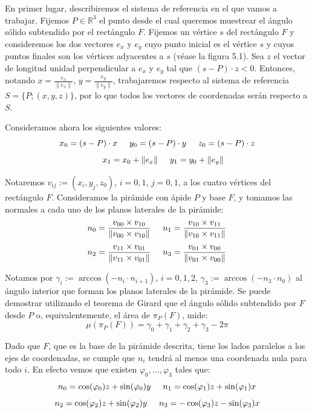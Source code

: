 En primer lugar, describiremos el sistema de referencia en el que vamos a trabajar. Fijemos $P\in\mathds{R}^3$ el punto desde el cual queremos muestrear el ángulo sólido subtendido por el rectángulo $F$. Fijemos un vértice $s$ del rectángulo $F$ y consideremos los dos vectores $e_x$ y $e_y$ cuyo punto inicial es el vértice $s$ y cuyos puntos finales son los vértices adyacentes a $s$ (véase la figura 5.1). Sea $z$ el vector de longitud unidad perpendicular a $e_x$ y $e_y$ tal que $(s-P)\cdot z < 0$. Entonces, notando $x=\frac{e_x}{\|e_x\|}$, $y=\frac{e_y}{\|e_y\|}$, trabajaremos respecto al sistema de referencia $S=\{P; (x, y, z)\}$, por lo que todos los vectores de coordenadas serán respecto a $S$.

Consideramos ahora los siguientes valores:
$$ x_0 = (s-P)\cdot x\hspace{0.5cm}y_0 = (s-P)\cdot y\hspace{0.5cm}z_0 = (s-P)\cdot z$$
$$\hspace{0.5cm}x_1 = x_0+\|e_x\|\hspace{0.5cm}y_1 = y_0+\|e_y\|$$

Notaremos $v_{ij} := (x_i,y_j,z_0)$, $i=0,1$, $j=0,1$, a los cuatro vértices del rectángulo $F$. Consideramos la pirámide con ápide $P$ y base $F$, y tomamos las normales a cada uno de los planos laterales de la pirámide:
$$ n_0 = \frac{v_{00}\times v_{10}}{\|v_{00}\times v_{10}\|}\hspace{0.5cm}n_1 = \frac{v_{10}\times v_{11}}{\|v_{10}\times v_{11}\|}$$
$$ n_2 = \frac{v_{11}\times v_{01}}{\|v_{11}\times v_{01}\|}\hspace{0.5cm}n_3 = \frac{v_{01}\times v_{00}}{\|v_{01}\times v_{00}\|}$$

Notamos por $\gamma_i := \arccos(-n_i\cdot n_{i+1})$, $i=0,1,2$, $\gamma_3 := \arccos(-n_3\cdot n_0)$ al ángulo interior que forman los planos laterales de la pirámide. Se puede demostrar utilizando el teorema de Girard que el ángulo sólido subtendido por $F$ desde $P$ o, equivalentemente, el área de $\pi_P(F)$, mide:
$$\mu(\pi_P(F)) = \gamma_0 +\gamma_1 + \gamma_2 + \gamma_3 - 2\pi $$

Dado que $F$, que es la base de la pirámide descrita, tiene los lados paralelos a los ejes de coordenadas, se cumple que $n_i$ tendrá al menos una coordenada nula para todo $i$. En efecto vemos que existen $\varphi_0,\ldots,\varphi_3$ tales que:
$$ n_0 = \cos(\varphi_0)z + \sin(\varphi_0)y\hspace{0.5cm}n_1 = \cos(\varphi_1)z + \sin(\varphi_1)x$$
$$ n_2 = \cos(\varphi_2)z + \sin(\varphi_2)y\hspace{0.5cm}n_3 = -\cos(\varphi_3)z - \sin(\varphi_3)x$$

